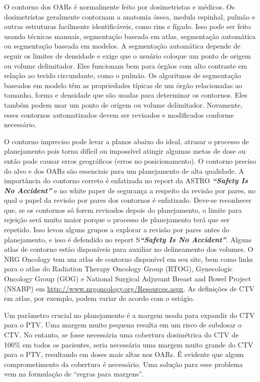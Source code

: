 \documentclass[11pt,a4paper]{article}
\newcounter{exemplo}
\begin{document}
	O contorno dos OARs é normalmente feito por dosimetristas e médicos. Os dosimetristas geralmente contornam a anatomia óssea, medula espinhal, pulmão e outras estruturas facilmente identificáveis, como rins e fígado. Isso pode ser feito usando técnicas manuais, segmentação baseada em atlas, segmentação automática ou segmentação baseada em modelos. A segmentação automática depende de seguir os limites de densidade e exige que o usuário coloque um ponto de origem ou volume delimitador. Eles funcionam bem para órgãos com alto contraste em relação ao tecido circundante, como o pulmão. Os algoritmos de segmentação baseados em modelo têm as propriedades típicas de um órgão relacionadas ao tamanho, forma e densidade que são usadas para determinar os contornos. Eles também podem usar um ponto de origem ou volume delimitador. Novamente, esses contornos automatizados devem ser revisados e modificados conforme necessário.

	O contorno impreciso pode levar a planos abaixo do ideal, atrasar o processo de planejamento pois torna difícil ou impossível atingir algumas metas de dose ou então pode causar erros geográficos (erros no posicionamento). O contorno preciso do alvo e dos OARs são essenciais para um planejamento de alta qualidade. A importância do contorno correto é enfatizada no report da ASTRO \textbf{\textit{``Safety Is No Accident''}} e no white paper de segurança a respeito da revisão por pares, no qual o papel da revisão por pares dos contornos é enfatizado. Deve-se reconhecer que, se os contornos só forem revisados depois do planejamento, o limite para rejeição será muito maior porque o processo de planejamento terá que ser repetido. Isso levou alguns grupos a explorar a revisão por pares antes do planejamento, e isso é defendido no report  S\textbf{\textit{``Safety Is No Accident''}}. Alguns atlas de contorno estão disponíveis para auxiliar no delineamento dos volumes. O NRG Oncology tem um atlas de contorno disponível em seu site, bem como links para o atlas do Radiation Therapy Oncology Group (RTOG), Gynecologic Oncology Group (GOG) e National Surgical Adjuvant Breast and Bowel Project (NSABP) em \href{http://www.nrgoncology.org/Resources.aspx}{http://www.nrgoncology.org/Resources.aspx}. As definições de CTV em atlas, por exemplo, podem variar de acordo com o estágio.

	Um parâmetro crucial no planejamento é a margem usada para expandir do CTV para o PTV. Uma margem muito pequena resulta em um risco de subdosar o CTV. No entanto, se fosse necessária uma cobertura dosimétrica do CTV de 100\% em todos os pacientes, seria necessária uma margem muito grande do CTV para o PTV, resultando em doses mais altas nos OARs. É evidente que algum comprometimento da cobertura é necessário. Uma solução para esse problema vem na formulação de ``regras para margens''.
\end{document}

